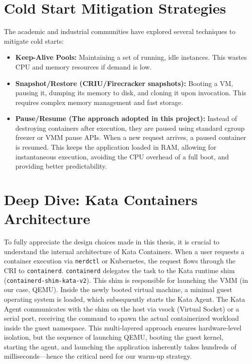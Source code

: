 \documentclass[12pt,a4paper]{report}
\begin{document}
\section{Cold Start Mitigation Strategies}
The academic and industrial communities have explored several techniques to mitigate cold starts:
\begin{itemize}
    \item \textbf{Keep-Alive Pools:} Maintaining a set of running, idle instances. This wastes CPU and memory resources if demand is low.
    \item \textbf{Snapshot/Restore (CRIU/Firecracker snapshots):} Booting a VM, pausing it, dumping its memory to disk, and cloning it upon invocation. This requires complex memory management and fast storage.
    \item \textbf{Pause/Resume (The approach adopted in this project):} Instead of destroying containers after execution, they are paused using standard cgroup freezer or VMM pause APIs. When a new request arrives, a paused container is resumed. This keeps the application loaded in RAM, allowing for instantaneous execution, avoiding the CPU overhead of a full boot, and providing better predictability.
\end{itemize}

\section{Deep Dive: Kata Containers Architecture}
To fully appreciate the design choices made in this thesis, it is crucial to understand the internal architecture of Kata Containers. When a user requests a container execution via \texttt{nerdctl} or Kubernetes, the request flows through the CRI to \texttt{containerd}. \texttt{containerd} delegates the task to the Kata runtime shim (\texttt{containerd-shim-kata-v2}).
This shim is responsible for launching the VMM (in our case, QEMU). Inside the newly booted virtual machine, a minimal guest operating system is loaded, which subsequently starts the Kata Agent. The Kata Agent communicates with the shim on the host via vsock (Virtual Socket) or a serial port, receiving the command to spawn the actual containerized workload inside the guest namespace.
This multi-layered approach ensures hardware-level isolation, but the sequence of launching QEMU, booting the guest kernel, starting the agent, and launching the application inherently takes hundreds of milliseconds—hence the critical need for our warm-up strategy.
\end{document}

